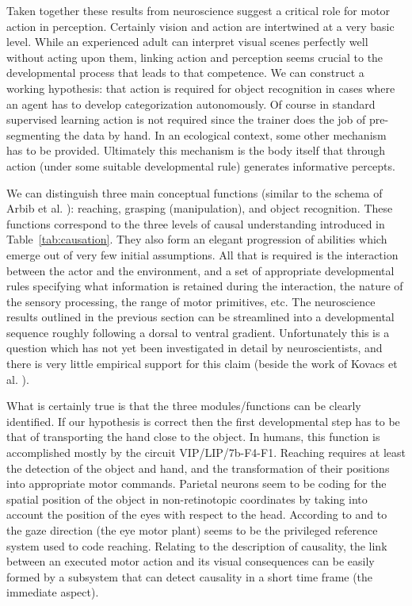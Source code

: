 Taken together these results from neuroscience suggest a critical role
for motor action in perception. Certainly vision and action are
intertwined at a very basic level.  While an
experienced adult can interpret visual scenes perfectly well without
acting upon them, linking action and perception seems crucial to the
developmental process that leads to that competence.  We can construct
a working hypothesis: that action is required for object recognition in
cases where an agent has to develop categorization autonomously. 
Of course in standard supervised learning action is not required since
the trainer does the job of pre-segmenting the data by hand.  In an
ecological context, some other mechanism has to be provided.
Ultimately this mechanism is the body itself that through action
(under some suitable developmental rule) generates informative
percepts.

We can distinguish three main conceptual functions (similar to the 
schema of Arbib et al. \cite{arbib-1981}): reaching, grasping (manipulation), and
object recognition. These functions correspond to the three levels of causal understanding introduced in Table~\ref{tab:causation}.
They also form an elegant progression of abilities which emerge out
of very few initial assumptions. All that is required is the 
interaction between the actor and the environment, and a set of appropriate
developmental rules specifying what information is retained during the
interaction, the nature of the sensory processing, the range of motor
primitives, etc. 
%
The neuroscience results outlined in the previous section can be streamlined
into a developmental sequence roughly following a dorsal to ventral
gradient. Unfortunately this is a question which has not yet been investigated in detail
by neuroscientists, and there is very little empirical support for this claim
(beside the work of Kovacs et al. \cite{kovacs00human}).

What is certainly true is that the three modules/functions can be 
clearly identified. If our hypothesis is correct then 
the first developmental step has to be that of transporting the hand 
close to the object. In humans, this function is accomplished mostly by the
circuit VIP/LIP/7b-F4-F1. Reaching requires at least the detection of
the object and hand, and the transformation of their positions into appropriate 
motor commands. Parietal neurons seem to be coding for the spatial
position of the object in non-retinotopic coordinates by taking
into account the position of the eyes with respect to the head. 
According to \cite{pouget-ducom-torri-bavelier-2002} and 
to \cite{flanders-daghestani-berthoz-1999} the 
gaze direction (the eye motor plant) seems to be the privileged
reference system used to code reaching. 
Relating to the description of causality, the link between an executed
motor action and its visual consequences can be easily formed by 
a subsystem that can detect causality in a short time frame (the immediate
aspect).


